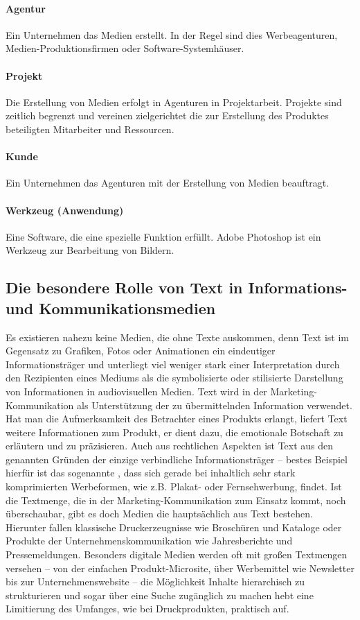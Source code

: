 \paragraph{Agentur} Ein Unternehmen das Medien erstellt. In der Regel sind dies Werbeagenturen, Medien-Produktionsfirmen oder Software-Systemhäuser. 

\paragraph{Projekt} Die Erstellung von Medien erfolgt in Agenturen in Projektarbeit. Projekte sind zeitlich begrenzt und vereinen zielgerichtet die zur Erstellung des Produktes beteiligten Mitarbeiter und Ressourcen. 

\paragraph{Kunde} Ein Unternehmen das Agenturen mit der Erstellung von Medien beauftragt.

\paragraph{Werkzeug (Anwendung)} Eine Software, die eine spezielle Funktion erfüllt. Adobe Photoshop ist ein Werkzeug zur Bearbeitung von Bildern.

\subsection{Die besondere Rolle von Text in Informations- und Kommunikationsmedien}

Es existieren nahezu keine Medien, die ohne Texte auskommen, denn Text ist im Gegensatz zu Grafiken, Fotos oder Animationen ein eindeutiger Informationsträger und unterliegt viel weniger stark einer Interpretation durch den Rezipienten eines Mediums als die symbolisierte oder stilisierte Darstellung von Informationen in audiovisuellen Medien. Text wird in der Marketing-Kommunikation als Unterstützung der zu übermittelnden Information verwendet. Hat man die Aufmerksamkeit des Betrachter eines Produkts erlangt, liefert Text weitere Informationen zum Produkt, er dient dazu, die emotionale Botschaft zu erläutern und zu präzisieren. Auch aus rechtlichen Aspekten ist Text aus den genannten Gründen der einzige verbindliche Informationsträger – bestes Beispiel hierfür ist das sogenannte , dass sich gerade bei inhaltlich sehr stark komprimierten Werbeformen, wie z.B. Plakat- oder Fernsehwerbung, findet. Ist die Textmenge, die in der Marketing-Kommunikation zum Einsatz kommt, noch überschaubar, gibt es doch Medien die hauptsächlich aus Text bestehen. Hierunter fallen klassische Druckerzeugnisse wie Broschüren und Kataloge oder Produkte der Unternehmenskommunikation wie Jahresberichte und Pressemeldungen. Besonders digitale Medien werden oft mit großen Textmengen versehen – von der einfachen Produkt-Microsite, über Werbemittel wie Newsletter bis zur Unternehmenswebsite – die Möglichkeit Inhalte hierarchisch zu strukturieren und sogar über eine Suche zugänglich zu machen hebt eine Limitierung des Umfanges, wie bei Druckprodukten, praktisch auf.

